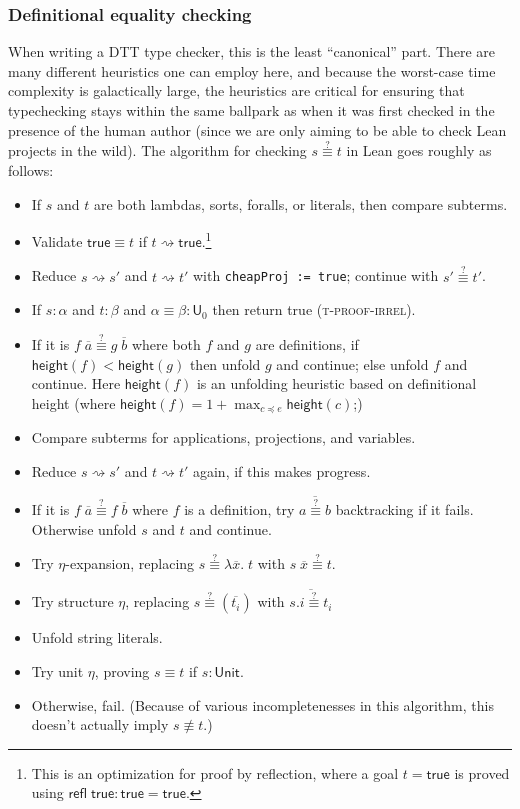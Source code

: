 \documentclass[sigplan,10pt,screen]{acmart}\settopmatter{printfolios=true,printccs=false,printacmref=false}
\newcommand{\U}{\mathsf{U}}
\begin{document}
\subsubsection{Definitional equality checking}
When writing a DTT type checker, this is the least ``canonical'' part. There are many different heuristics one can employ here, and because the worst-case time complexity is galactically large, the heuristics are critical for ensuring that typechecking stays within the same ballpark as when it was first checked in the presence of the human author (since we are only aiming to be able to check Lean projects in the wild). The algorithm for checking $s\overset{?}{\equiv} t$ in Lean goes roughly as follows:

\begin{itemize}
  \item If $s$ and $t$ are both lambdas, sorts, foralls, or literals, then compare subterms.
  \item Validate $\mathsf{true}\equiv t$ if $t\rightsquigarrow \mathsf{true}$.\footnote{This is an optimization for proof by reflection, where a goal $t=\mathsf{true}$ is proved using $\mathsf{refl}\;\mathsf{true}:\mathsf{true}=\mathsf{true}$.}
  \item Reduce $s\rightsquigarrow s'$ and $t\rightsquigarrow t'$ with \lstinline|cheapProj := true|; continue with $s'\overset{?}{\equiv} t'$.
  \item If $s:\alpha$ and $t:\beta$ and $\alpha\equiv\beta:\U_0$ then return true (\textsc{t-proof-irrel}).
  \item If it is $f\;\overline{a}\overset{?}{\equiv} g\;\overline{b}$ where both $f$ and $g$ are definitions, if $\mathsf{height}(f)<\mathsf{height}(g)$ then unfold $g$ and continue; else unfold $f$ and continue. Here $\mathsf{height}(f)$ is an unfolding heuristic based on definitional height (where $\mathsf{height}(f)=1+\max_{c\preceq e}\mathsf{height}(c)$;)
  \item Compare subterms for applications, projections, and variables.
  \item Reduce $s\rightsquigarrow s'$ and $t\rightsquigarrow t'$ again, if this makes progress.
  \item If it is $f\;\overline{a}\overset{?}{\equiv} f\;\overline{b}$ where $f$ is a definition, try $\overline{a\overset{?}{\equiv}b}$ backtracking if it fails. Otherwise unfold $s$ and $t$ and continue.
  \item Try $\eta$-expansion, replacing $s\overset{?}{\equiv} \lambda \overline{x}.\;t$ with $s\;\overline{x}\overset{?}{\equiv} t$.
  \item Try structure $\eta$, replacing $s\overset{?}{\equiv} (\overline{t_i})$ with $\overline{s.i\overset{?}{\equiv}t_i}$
  \item Unfold string literals.
  \item Try unit $\eta$, proving $s\equiv t$ if $s:\mathsf{Unit}$.
  \item Otherwise, fail. (Because of various incompletenesses in this algorithm, this doesn't actually imply $s\not\equiv t$.)
\end{itemize}
\end{document}
